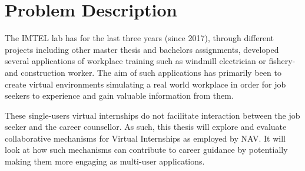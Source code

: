 \section{Problem Description}
The IMTEL lab has for the last three years (since 2017), through different projects including other master thesis and bachelors assignments, developed several applications of workplace training such as windmill electrician \cite{henrichsen2019engaging} or fishery- and construction worker. The aim of such applications has primarily been to create virtual environments simulating a real world workplace in order for job seekers to experience and gain valuable information from them.

These single-users virtual internships do not facilitate interaction between the job seeker and the career counsellor. 
As such, this thesis will explore and evaluate collaborative mechanisms for Virtual Internships as employed by NAV. It will look at how such mechanisms can contribute to career guidance by potentially making them more engaging as multi-user applications.


\clearpage

